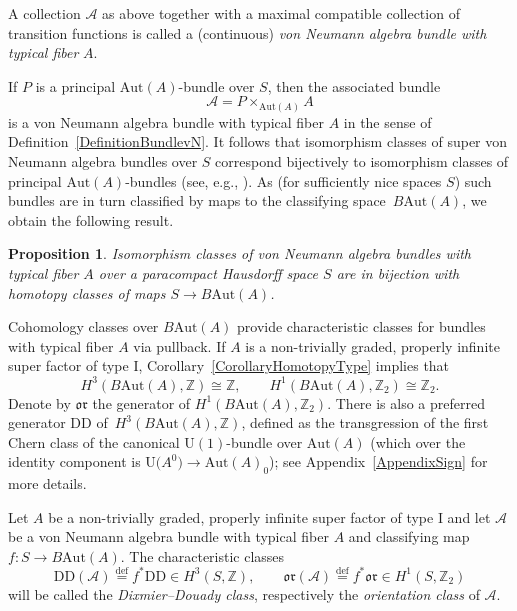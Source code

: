 \documentclass[11pt]{article}
\numberwithin{equation}{section}
\numberwithin{equation}{section}
\newtheorem{Proposition}[Theorem]{Proposition}
\newcommand{\Z}{\mathbb{Z}}
\newcommand{\A}{\mathcal{A}}
\newcommand{\Aut}{\mathrm{Aut}}
\newcommand{\U}{\mathrm{U}}
\newcommand{\DD}{\mathrm{DD}}
\newcommand{\defeq}{\stackrel{\mathrm{def}}{=}}
\newcommand{\oclass}{\mathfrak{or}}
\begin{document}
\begin{Definition} \label{DefinitionBundlevN}
A collection $\A$ as above together with a maximal compatible collection of transition functions is called a (continuous) \emph{von Neumann algebra bundle with typical fiber} $A$.
\end{Definition}

If $P$ is a principal $\Aut(A)$-bundle over $S$, then the associated bundle
\begin{equation*}
\A = P \times_{\Aut(A)} A
\end{equation*}
 is a von Neumann algebra bundle with typical fiber $A$ in the sense of Definition~\ref{DefinitionBundlevN}.
It follows that isomorphism classes of super von Neumann algebra bundles over $S$ %
correspond bijectively to isomorphism classes of principal $\Aut(A)$-bundles (see, e.g., \cite[Section~4]{PennigWStarBundles}).
As (for sufficiently nice spaces $S$) such bundles are in turn classified by maps to the classifying space~$B\Aut(A)$, we obtain the following result.

\begin{Proposition} \label{PropositionClassifyingWStar}
 Isomorphism classes of von Neumann algebra bundles with typical fiber $A$ over a paracompact Hausdorff space $S$ are in bijection with homotopy classes of maps $S \to B\Aut(A)$.
\end{Proposition}

Cohomology classes over $B\Aut(A)$ provide characteristic classes for bundles with typical fiber $A$ via pullback.
If $A$ is a non-trivially graded, properly infinite super factor of type I,
Corollary~\ref{CorollaryHomotopyType} implies that
\begin{equation*}
 H^3(B\Aut(A), \Z) \cong \Z, \qquad H^1(B\Aut(A), \Z_2) \cong \Z_2.
\end{equation*}
Denote by $\oclass$ the generator of $H^1(B\Aut(A), \Z_2)$.
There is also a preferred generator $\DD$ of~$H^3(B\Aut(A), \Z)$, defined as the transgression of the first Chern class of the canonical $\U(1)$-bundle over $\Aut(A)$ (which over the identity component is $\U\big(A^0\big) \to \Aut(A)_0$);
see Appendix~\ref{AppendixSign} for more details.

\begin{Definition} \label{DefinitionCharacteristicClasses}
Let $A$ be a non-trivially graded, properly infinite super factor of type I and let $\A$ be a von Neumann algebra bundle with typical fiber $A$ and classifying map $f\colon S \to B\Aut(A)$.
The characteristic classes
\begin{equation*}
 \DD(\A) \defeq f^* \DD \in H^3(S, \Z), \qquad \oclass(\A) \defeq f^*\oclass \in H^1(S, \Z_2)
\end{equation*}
will be called the \emph{Dixmier--Douady class}, respectively the \emph{orientation class} of $\mathcal{A}$.
\end{Definition}
\end{document}
